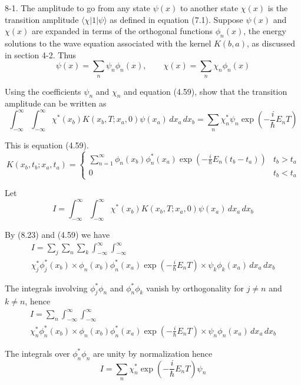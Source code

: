 \documentclass[12pt]{article}
\begin{document}
8-1.
The amplitude to go from any state $\psi(x)$ to another
state $\chi(x)$ is the transition amplitude $\langle\chi|1|\psi\rangle$
as defined in equation (7.1).
Suppose $\psi(x)$ and $\chi(x)$ are expanded in terms of the orthogonal
functions $\phi_n(x)$, the energy solutions to the wave equation associated
with the kernel $K(b,a)$, as discussed in section 4-2. Thus
\begin{equation*}
\psi(x)=\sum_n\psi_n\phi_n(x),\qquad\chi(x)=\sum_n\chi_n\phi_n(x)
\tag{8.23}
\end{equation*}

Using the coefficients $\psi_n$ and $\chi_n$ and equation (4.59),
show that the transition amplitude can be written as
\begin{equation*}
\int_{-\infty}^\infty\int_{-\infty}^\infty
\chi^*(x_b)K(x_b,T;x_a,0)\psi(x_a)\,dx_a\,dx_b
=\sum_n\chi_n^*\psi_n\exp\left(-\frac{i}{\hbar}E_nT\right)
\tag{8.24}
\end{equation*}

This is equation (4.59).
\begin{equation*}
K(x_b,t_b;x_a,t_a)=\begin{cases}
\sum_{n=1}^\infty\phi_n(x_b)\phi_n^*(x_a)
\exp\left(-\frac{i}{\hbar}E_n(t_b-t_a)\right) & t_b>t_a
\\
0 & t_b<t_a
\end{cases}
\tag{4.59}
\end{equation*}

Let
\begin{equation*}
I=\int_{-\infty}^\infty\int_{-\infty}^\infty
\chi^*(x_b)K(x_b,T;x_a,0)\psi(x_a)\,dx_a\,dx_b
\end{equation*}

By (8.23) and (4.59) we have
\begin{multline*}
I=\sum_j\sum_n\sum_k\int_{-\infty}^\infty\int_{-\infty}^\infty
\\
\chi_j^*\phi_j^*(x_b)
\times
\phi_n(x_b)\phi_n^*(x_a)\exp\left(-\frac{i}{\hbar}E_nT\right)
\times
\psi_k\phi_k(x_a)
\,dx_a\,dx_b
\end{multline*}

The integrals involving $\phi_j^*\phi_n$ and $\phi_n^*\phi_k$
vanish by orthogonality for $j\ne n$ and $k\ne n$, hence
\begin{multline*}
I=\sum_n\int_{-\infty}^\infty\int_{-\infty}^\infty
\\
\chi_n^*\phi_n^*(x_b)
\times
\phi_n(x_b)\phi_n^*(x_a)\exp\left(-\frac{i}{\hbar}E_nT\right)
\times
\psi_n\phi_n(x_a)
\,dx_a\,dx_b
\end{multline*}

The integrals over $\phi_n^*\phi_n$ are unity by normalization hence
\begin{equation*}
I=\sum_n\chi_n^*\exp\left(-\frac{i}{\hbar}E_nT\right)\psi_n
\end{equation*}
\end{document}

